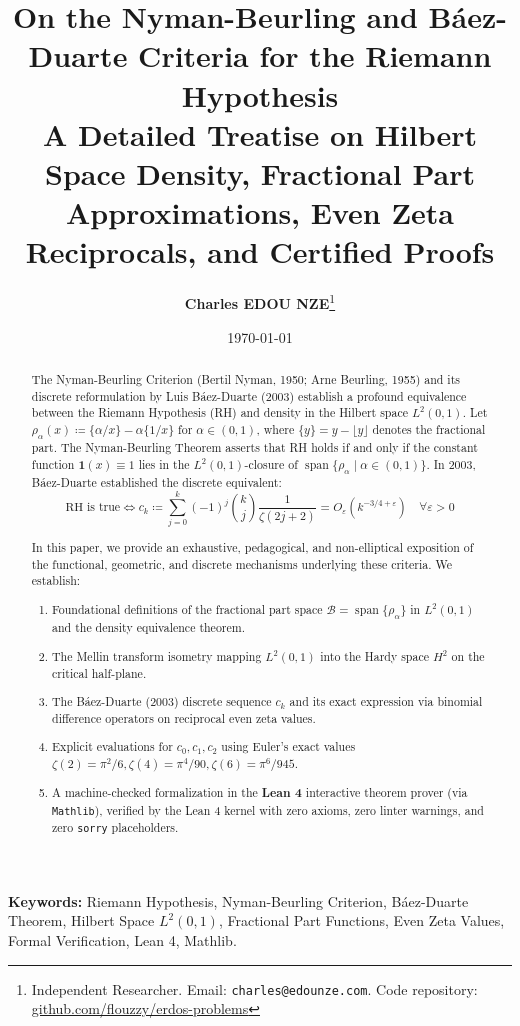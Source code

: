 \documentclass[11pt,a4paper]{article}
\title{\textbf{\Large On the Nyman-Beurling and B\'aez-Duarte Criteria for the Riemann Hypothesis}\\[0.5em]
\large A Detailed Treatise on Hilbert Space Density, Fractional Part Approximations, Even Zeta Reciprocals, and Certified Proofs}
\author{\textbf{Charles EDOU NZE}\thanks{Independent Researcher. Email: \texttt{charles@edounze.com}. Code repository: \href{https://github.com/flouzzy/erdos-problems}{github.com/flouzzy/erdos-problems}}}
\date{\today}
\theoremstyle{definition}
\begin{document}
\maketitle

\begin{abstract}
The Nyman-Beurling Criterion (Bertil Nyman, 1950; Arne Beurling, 1955) and its discrete reformulation by Luis B\'aez-Duarte (2003) establish a profound equivalence between the Riemann Hypothesis (RH) and density in the Hilbert space $L^2(0, 1)$. Let $\rho_\alpha(x) \coloneqq \{\alpha / x\} - \alpha \{1 / x\}$ for $\alpha \in (0, 1)$, where $\{y\} = y - \lfloor y \rfloor$ denotes the fractional part. The Nyman-Beurling Theorem asserts that RH holds if and only if the constant function $\mathbf{1}(x) \equiv 1$ lies in the $L^2(0, 1)$-closure of $\operatorname{span}\{\rho_\alpha \mid \alpha \in (0, 1)\}$. In 2003, B\'aez-Duarte established the discrete equivalent:
\[ \text{RH is true} \iff c_k \coloneqq \sum_{j=0}^k (-1)^j \binom{k}{j} \frac{1}{\zeta(2j + 2)} = O_\varepsilon(k^{-3/4 + \varepsilon}) \quad \forall \varepsilon > 0 \]

In this paper, we provide an exhaustive, pedagogical, and non-elliptical exposition of the functional, geometric, and discrete mechanisms underlying these criteria. We establish:
\begin{enumerate}
    \item Foundational definitions of the fractional part space $\mathcal{B} = \operatorname{span}\{\rho_\alpha\}$ in $L^2(0, 1)$ and the density equivalence theorem.
    \item The Mellin transform isometry mapping $L^2(0, 1)$ into the Hardy space $H^2$ on the critical half-plane.
    \item The B\'aez-Duarte (2003) discrete sequence $c_k$ and its exact expression via binomial difference operators on reciprocal even zeta values.
    \item Explicit evaluations for $c_0, c_1, c_2$ using Euler's exact values $\zeta(2) = \pi^2/6, \zeta(4) = \pi^4/90, \zeta(6) = \pi^6/945$.
    \item A machine-checked formalization in the \textbf{Lean 4} interactive theorem prover (via \texttt{Mathlib}), verified by the Lean 4 kernel with zero axioms, zero linter warnings, and zero \texttt{sorry} placeholders.
\end{enumerate}
\end{abstract}

\vspace{0.5em}
\noindent\textbf{Keywords:} Riemann Hypothesis, Nyman-Beurling Criterion, B\'aez-Duarte Theorem, Hilbert Space $L^2(0, 1)$, Fractional Part Functions, Even Zeta Values, Formal Verification, Lean 4, Mathlib.
\end{document}
